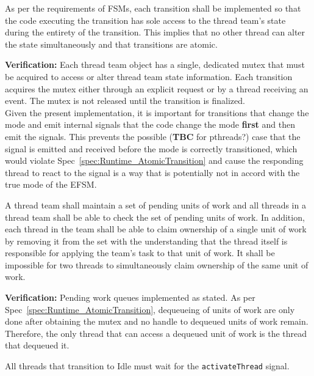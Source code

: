 \documentclass{article}
\begin{document}
\begin{spec}
\label{spec:Runtime_AtomicTransition}
As per the requirements of FSMs, each transition shall be implemented so that
the code executing the transition has sole access to the thread team's state
during the entirety of the transition.  This implies that no other thread can
alter the state simultaneously and that transitions are atomic.
\end{spec}
\textbf{Verification:}\hspace{0.125in}  Each thread team object has a single,
dedicated mutex that must be acquired to access or alter thread team state
information.  Each transition acquires the mutex either through an explicit
request or by a thread receiving an event.  The mutex is not released until
the transition is finalized.\\

Given the present implementation, it is important for transitions that
change the mode and emit internal signals that the code change the mode
\textbf{first} and then emit the signals.  This prevents the possible
(\textbf{TBC} for pthreads?) case that the signal is emitted and received before
the mode is correctly transitioned, which would violate
Spec~\ref{spec:Runtime_AtomicTransition} and cause the responding thread
to react to the signal is a way that is potentially not in accord with the true
mode of the EFSM.

\begin{spec}
A thread team shall maintain a set of pending units of work and all threads in a
thread team shall be able to check the set of pending units of work.  In
addition, each thread in the team shall be able to claim ownership of a single
unit of work by removing it from the set with the understanding that the thread
itself is responsible for applying the team's task to that unit of work.  It
shall be impossible for two threads to simultaneously claim ownership of the
same unit of work.
\end{spec}
\textbf{Verification:}\hspace{0.125in}  Pending work queues implemented as
stated.  As per Spec~\ref{spec:Runtime_AtomicTransition}, dequeueing of units of
work are only done after obtaining the mutex and no handle to dequeued units of
work remain.  Therefore, the only thread that can access a dequeued unit of work
is the thread that dequeued it.
\begin{spec}
All threads that transition to Idle must wait for the \texttt{activateThread}
signal.
\label{spec:IdleActivateThread}
\end{spec}
\end{document}
